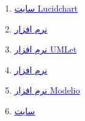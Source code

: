 \documentclass[]{article}
\begin{document}
\begin{enumerate}

\item

\href{https://www.lucidchart.com/pages/}{\textcolor{blue}{\underline{سایت Lucidchart}}} 


\item

\href{https://www.google.com}{\textcolor{blue}{\underline{نرم افزار }}} 


\item

\href{https://www.umlet.com/changes.htm}{\textcolor{blue}{\underline{نرم افزار UMLet}}} 


\item

\href{https://online.visual-paradigm.com/}{\textcolor{blue}{\underline{نرم افزار }}} 


\item

\href{https://www.modelio.org/}{\textcolor{blue}{\underline{نرم افزار Modelio}}} 


\item

\href{https://www.google.com}{\textcolor{blue}{\underline{سایت }}} 



\end{enumerate}
\end{document}
